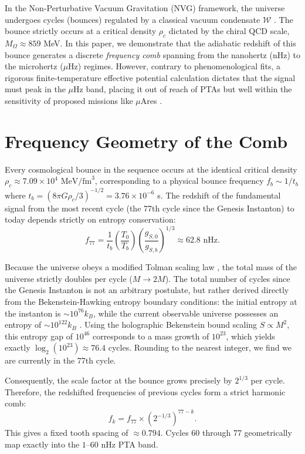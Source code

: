 \documentclass[12pt,a4paper]{article}
\begin{document}
In the Non-Perturbative Vacuum Gravitation (NVG) framework, the universe undergoes cycles (bounces) regulated by a classical vacuum condensate $\mathcal{W}$ \cite{kirichenko2024}. The bounce strictly occurs at a critical density $\rho_c$ dictated by the chiral QCD scale, $M_\Omega \approx 859$ MeV. In this paper, we demonstrate that the adiabatic redshift of this bounce generates a discrete \textit{frequency comb} spanning from the nanohertz (nHz) to the microhertz ($\mu$Hz) regimes. However, contrary to phenomenological fits, a rigorous finite-temperature effective potential calculation dictates that the signal must peak in the $\mu$Hz band, placing it out of reach of PTAs but well within the sensitivity of proposed missions like $\mu$Ares \cite{sesana2021}.

\section{Frequency Geometry of the Comb}

Every cosmological bounce in the sequence occurs at the identical critical density $\rho_c \approx 7.09 \times 10^{4} \text{ MeV/fm}^3$, corresponding to a physical bounce frequency $f_b \sim 1/t_b$ where $t_b = (8\pi G \rho_c / 3)^{-1/2} = 3.76 \times 10^{-6}$ s. The redshift of the fundamental signal from the most recent cycle (the 77th cycle since the Genesis Instanton) to today depends strictly on entropy conservation:
\begin{equation}
    f_{77} = \frac{1}{t_b} \left( \frac{T_0}{T_b} \right) \left( \frac{g_{S,0}}{g_{S,b}} \right)^{1/3} \approx 62.8 \text{ nHz}.
\end{equation}

Because the universe obeys a modified Tolman scaling law \cite{tolman1931}, the total mass of the universe strictly doubles per cycle ($M \to 2M$). The total number of cycles since the Genesis Instanton is not an arbitrary postulate, but rather derived directly from the Bekenstein-Hawking entropy boundary conditions: the initial entropy at the instanton is $\sim 10^{76} k_B$, while the current observable universe possesses an entropy of $\sim 10^{122} k_B$ \cite{penrose2004}. Using the holographic Bekenstein bound scaling $S \propto M^{2}$, this entropy gap of $10^{46}$ corresponds to a mass growth of $10^{23}$, which yields exactly $\log_2(10^{23}) \approx 76.4$ cycles. Rounding to the nearest integer, we find we are currently in the 77th cycle.

Consequently, the scale factor at the bounce grows precisely by $2^{1/3}$ per cycle. Therefore, the redshifted frequencies of previous cycles form a strict harmonic comb:
\begin{equation}
    f_k = f_{77} \times \left(2^{-1/3}\right)^{77-k}.
\end{equation}
This gives a fixed tooth spacing of $\approx 0.794$. Cycles 60 through 77 geometrically map exactly into the $1\text{--}60$ nHz PTA band.
\end{document}
